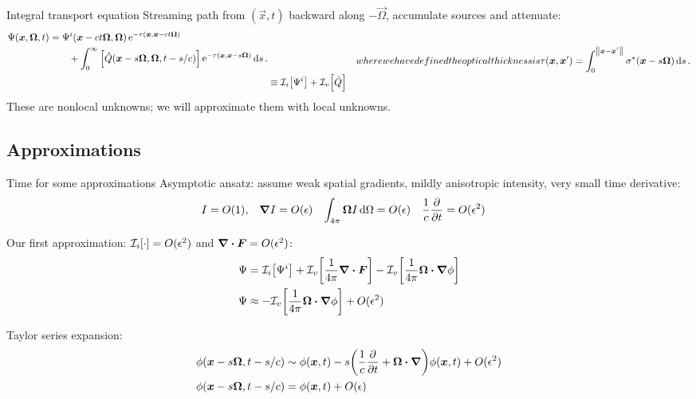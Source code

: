 \documentclass{beamer}
\begin{document}
\begin{frame}{Integral transport equation}
  Streaming path from $(\vec{x}, t)$ backward along $-\vec{\Omega}$, accumulate
  sources and attenuate:
\begin{subequations} \label{eqs:inverseTransport}
  \begin{align} \label{eq:inverseTransportFull}
  \begin{split}
    \Psi(\vec{x}, \vec{\Omega}, t)
    &= \Psi^i( \vec{x} - ct \vec{\Omega}, \vec{\Omega})
    \eexp^{ -\tau(\vec{x}, \vec{x} - ct \vec{\Omega})}
    \\
    &\qquad + \int_{0}^{\infty}
    \left[ \hat Q(\vec{x} - s \vec{\Omega}, \vec{\Omega}, t-s/c)
    \right]
    \eexp^{ -\tau(\vec{x}, \vec{x} - s \vec{\Omega})}
    \ud s\,.
  \end{split}
    \\ 
    &\equiv \lopinv{i}{\Psi^i}
    + \lopinv{v}{\hat Q} 
  \end{align}
  where we have defined the optical thickness is 
  \begin{equation} \label{eq:fullTauDefinition}
    \tau(\vec{x}, \vec{x}') = \int_{0}^{\norm{\vec{x} -
    \vec{x}'}} \sigma^\ast(\vec{x}-s\vec{\Omega}) \ud s \,.
  \end{equation}
\end{subequations}
These are nonlocal unknowns; we will approximate them with local unknowns.
\end{frame}

\subsection{Approximations}
\begin{frame}{Time for some approximations}
  Asymptotic ansatz: assume weak spatial gradients, mildly anisotropic intensity, very small time
  derivative:
\begin{align*}
  I &= O(1), &
  \bm{\nabla} I &= O(\epsilon)&
  \int_{4\pi} \bm{\Omega} I\mathop{}\!\mathrm{d}\Omega &= O(\epsilon)&
  \frac{1}{c} \frac{\partial }{\partial t} &= O(\epsilon^2)
\end{align*}

Our first approximation: $\mathcal{I}_{i}\!\left[\cdot\right] = O(\epsilon^2)$ and $\bm{\nabla} \bm{\cdot} \bm{F} =
O(\epsilon^2)$:
\begin{align*}
  \Psi &=
  \mathcal{I}_{i}\!\left[\Psi^i\right]
  + \mathcal{I}_{v}\!\left[\frac{1}{4\pi} \bm{\nabla} \bm{\cdot}\bm{F}\right] -
  \mathcal{I}_{v}\!\left[\frac{1}{4\pi} \bm{\Omega}\bm{\cdot} \bm{\nabla} \phi\right]
    \\ 
  \Psi 
  &\approx
  - \mathcal{I}_{v}\!\left[\frac{1}{4\pi} \bm{\Omega}\bm{\cdot} \bm{\nabla} \phi\right]
  + O(\epsilon^2)
\end{align*}

Taylor series expansion:
\begin{align} \nonumber
  \phi(\bm{x} - s\bm{\Omega}, t - s/c)
  &\sim \phi(\bm{x}, t)
  - s \bigg( \frac{1}{c} \frac{\partial }{\partial t} + \bm{\Omega} \bm{\cdot} \bm{\nabla} \bigg)
  \phi(\bm{x}, t) + O(\epsilon^2)
\\ \label{eq:taylorPhi}
\phi(\bm{x} - s\bm{\Omega}, t - s/c)
&= \phi(\bm{x}, t) + O(\epsilon)
\end{align}
\end{frame}
\end{document}
